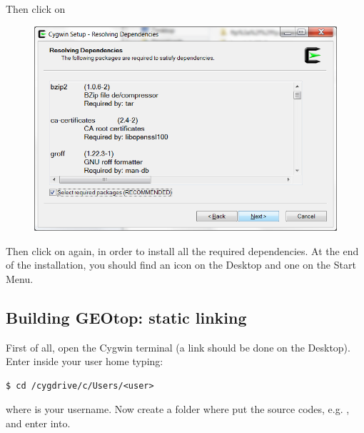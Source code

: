 Then click on 

\begin{figure}[h]
  \includegraphics[width=\linewidth]{2015/Aug/25/proj4.png}
\end{figure}

Then click on  again, in order to install all the required dependencies. At the end of the installation, you should find an icon on the Desktop and one on the Start Menu.

\subsection{Building GEOtop: static linking}

First of all, open the Cygwin terminal (a link should be done on the Desktop). Enter inside your user home typing:

\begin{lstlisting}[style=bashStyle]
$ cd /cygdrive/c/Users/<user>
\end{lstlisting} %

where  is your username. Now create a folder where put the source codes, e.g. , and enter into. %



